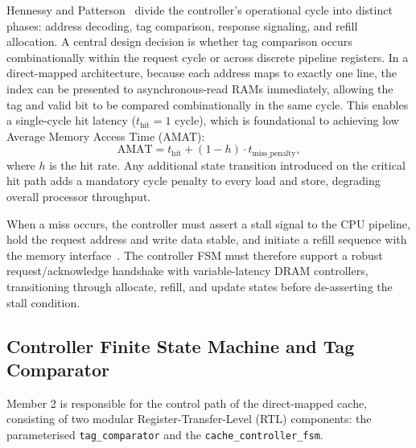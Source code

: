 Hennessy and Patterson~\cite{hennessy2017,patterson2020} divide the
controller's operational cycle into distinct phases: address decoding, tag
comparison, response signaling, and refill allocation. A central design
decision is whether tag comparison occurs combinationally within the
request cycle or across discrete pipeline registers. In a direct-mapped
architecture, because each address maps to exactly one line, the index
can be presented to asynchronous-read RAMs immediately, allowing the tag
and valid bit to be compared combinationally in the same cycle. This
enables a single-cycle hit latency ($t_{\mathrm{hit}} = 1\text{ cycle}$),
which is foundational to achieving low Average Memory Access Time (AMAT):
\begin{equation}
\mathrm{AMAT} = t_{\mathrm{hit}} + (1 - h) \cdot t_{\mathrm{miss\_penalty}},
\label{eq:amat-m2}
\end{equation}
where $h$ is the hit rate. Any additional state transition introduced on
the critical hit path adds a mandatory cycle penalty to every load and
store, degrading overall processor throughput.

When a miss occurs, the controller must assert a stall signal to the CPU
pipeline, hold the request address and write data stable, and initiate a
refill sequence with the memory interface~\cite{hill1989}. The controller
FSM must therefore support a robust request/acknowledge handshake with
variable-latency DRAM controllers, transitioning through allocate, refill,
and update states before de-asserting the stall condition.


\subsection{Controller Finite State Machine and Tag Comparator}
\label{sec:solution-m2}

Member 2 is responsible for the control path of the direct-mapped cache,
consisting of two modular Register-Transfer-Level (RTL) components:
the parameterised \texttt{tag\_comparator} and the \texttt{cache\_controller\_fsm}.


